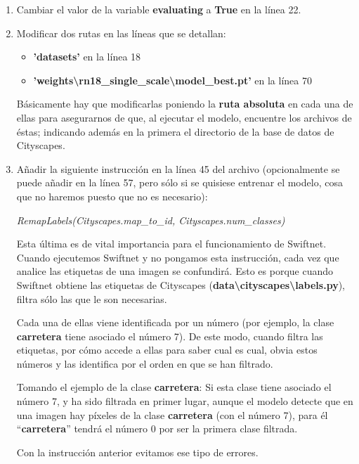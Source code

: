\begin{enumerate}
\item Cambiar el valor de la variable \textbf{evaluating} a \textbf{True} en la línea 22.
\item Modificar dos rutas en las líneas que se detallan:
\begin{itemize}
\item \textbf{'datasets'} en la línea 18
\item \textbf{'weights\textbackslash{rn18\_single\_scale}\textbackslash{model\_best.pt}'} en la línea 70
\end{itemize}

Básicamente hay que modificarlas poniendo la \textbf{ruta absoluta} en cada una de ellas para asegurarnos de que, al ejecutar el modelo, encuentre los archivos de éstas; indicando además en la primera el directorio de la base de datos de Cityscapes.

\item Añadir la siguiente instrucción en la línea 45 del archivo (opcionalmente se puede añadir en la línea 57, pero sólo si se quisiese entrenar el modelo, cosa que no haremos puesto que no es necesario):

\begin{center}
\textit{RemapLabels(Cityscapes.map\_to\_id, Cityscapes.num\_classes)}
\end{center}

Esta última es de vital importancia para el funcionamiento de Swiftnet. Cuando ejecutemos Swiftnet y no pongamos esta instrucción, cada vez que analice las etiquetas de una imagen se confundirá. Esto es porque cuando Swiftnet obtiene las etiquetas de Cityscapes (\textbf{data\textbackslash{cityscapes}\textbackslash{labels.py}}), filtra sólo las que le son necesarias.

Cada una de ellas viene identificada por un número (por ejemplo, la clase \textbf{carretera} tiene asociado el número 7). De este modo, cuando filtra las etiquetas, por cómo accede a ellas para saber cual es cual, obvia estos números y las identifica por el orden en que se han filtrado.

Tomando el ejemplo de la clase \textbf{carretera}: Si esta clase tiene asociado el número 7, y ha sido filtrada en primer lugar, aunque el modelo detecte que en una imagen hay píxeles de la clase \textbf{carretera} (con el número 7), para él ``\textbf{carretera}'' tendrá el número 0 por ser la primera clase filtrada.

Con la instrucción anterior evitamos ese tipo de errores.
\end{enumerate}

